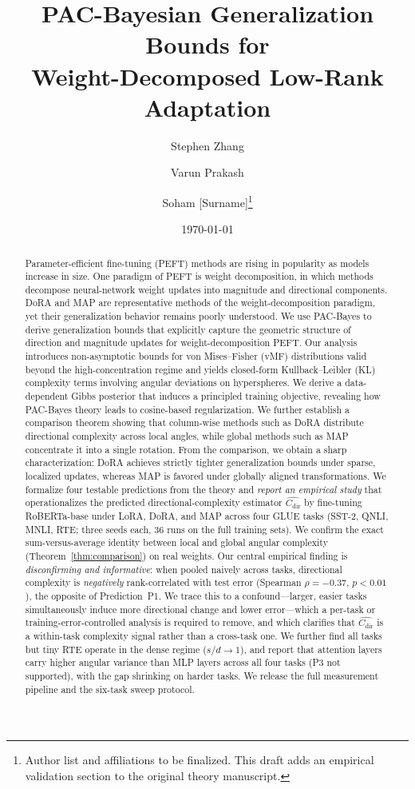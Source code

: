\documentclass[11pt]{article}
\title{\textbf{PAC-Bayesian Generalization Bounds for\\
Weight-Decomposed Low-Rank Adaptation}}
\author{Stephen Zhang \and Varun Prakash \and Soham [Surname]\thanks{Author list and
affiliations to be finalized. This draft adds an empirical validation section to
the original theory manuscript.}}
\date{\today}
\newcommand{\Cdir}{C_{\mathrm{dir}}}
\begin{document}
\maketitle

\begin{abstract}
Parameter-efficient fine-tuning (PEFT) methods are rising in popularity as models
increase in size. One paradigm of PEFT is weight decomposition, in which methods
decompose neural-network weight updates into magnitude and directional components.
DoRA and MAP are representative methods of the weight-decomposition paradigm, yet
their generalization behavior remains poorly understood. We use PAC-Bayes to derive
generalization bounds that explicitly capture the geometric structure of direction
and magnitude updates for weight-decomposition PEFT. Our analysis introduces
non-asymptotic bounds for von Mises--Fisher (vMF) distributions valid beyond the
high-concentration regime and yields closed-form Kullback--Leibler (KL) complexity
terms involving angular deviations on hyperspheres. We derive a data-dependent Gibbs
posterior that induces a principled training objective, revealing how PAC-Bayes
theory leads to cosine-based regularization. We further establish a comparison
theorem showing that column-wise methods such as DoRA distribute directional
complexity across local angles, while global methods such as MAP concentrate it into
a single rotation. From the comparison, we obtain a sharp characterization: DoRA
achieves strictly tighter generalization bounds under sparse, localized updates,
whereas MAP is favored under globally aligned transformations. We formalize four
testable predictions from the theory and \emph{report an empirical study} that
operationalizes the predicted directional-complexity estimator $\widehat{\Cdir}$ by
fine-tuning RoBERTa-base under LoRA, DoRA, and MAP across four GLUE tasks (SST-2,
QNLI, MNLI, RTE; three seeds each, 36 runs on the full training sets). We confirm
the exact sum-versus-average identity between local and global angular complexity
(Theorem~\ref{thm:comparison}) on real weights. Our central empirical finding is
\emph{disconfirming and informative}: when pooled naively across tasks, directional
complexity is \emph{negatively} rank-correlated with test error (Spearman
$\rho=-0.37$, $p<0.01$), the opposite of Prediction~P1. We trace this to a
confound---larger, easier tasks simultaneously induce more directional change and
lower error---which a per-task or training-error-controlled analysis is required to
remove, and which clarifies that $\widehat{\Cdir}$ is a within-task complexity signal
rather than a cross-task one. We further find all tasks but tiny RTE operate in the
dense regime ($s/d\to1$), and report that attention layers carry higher angular
variance than MLP layers across all four tasks (P3 not supported), with the gap
shrinking on harder tasks. We release the full measurement pipeline and the six-task
sweep protocol.
\end{abstract}
\end{document}
